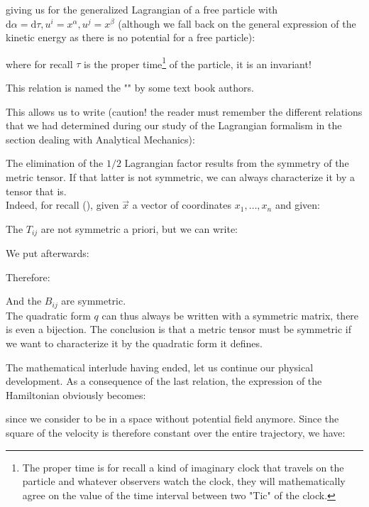 	giving us for the generalized Lagrangian of a free particle with $\mathrm{d}\alpha=\mathrm{d}\tau,u^i=x^\alpha,u^j=x^\beta$ (although we fall back on the general expression of the kinetic energy as there is no potential for a free particle):
	
	where for recall $\tau$ is the proper time\footnote{The proper time is for recall a kind of imaginary clock that travels on the particle and whatever observers watch the clock, they will mathematically agree on the value of the time interval between two "Tic" of the clock.} of the particle, it is an invariant!
	\begin{tcolorbox}[title=Remark,colframe=black,arc=10pt]
	This relation is named the "" by some text book authors.
	\end{tcolorbox}
	This allows us to write (caution! the reader must remember the different relations that we had determined during our study of the Lagrangian formalism in the section dealing with Analytical Mechanics):
	
	\begin{tcolorbox}[title=Remark,colframe=black,arc=10pt]
	The elimination of the $1/2$ Lagrangian factor results from the symmetry of the metric tensor. If that latter is not symmetric, we can always characterize it by a tensor that is.\\

	Indeed, for recall (), given $\vec{x}$ a vector of coordinates $x_1,\ldots,x_n$ and given:
	
	The $T_{ij}$ are not symmetric a priori, but we can write:
	
	We put afterwards:
	
	Therefore:
	
	And the $B_{ij}$ are symmetric.\\
	
	The quadratic form $q$ can thus always be written with a symmetric matrix, there is even a bijection. The conclusion is that a metric tensor must be symmetric if we want to characterize it by the quadratic form it defines.
	\end{tcolorbox}
	The mathematical interlude having ended, let us continue our physical development. As a consequence of the last relation, the expression of the Hamiltonian obviously becomes:
	
	since we consider to be in a space without potential field anymore. Since the square of the velocity is therefore constant over the entire trajectory, we have:
	
